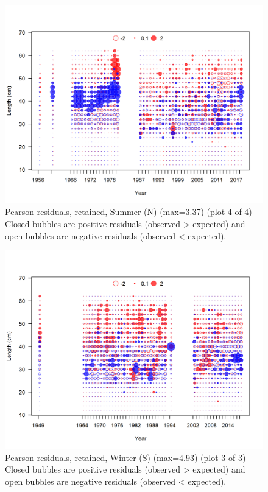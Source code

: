 \documentclass[12pt,]{article}
\begin{document}
\begin{figure}
\centering
\includegraphics{r4ss/plots_mod1/comp_lenfit_residsflt2mkt2_page4.png}
\caption{Pearson residuals, retained, Summer (N) (max=3.37) (plot 4 of
4)\\
Closed bubbles are positive residuals (observed \textgreater{} expected)
and open bubbles are negative residuals (observed \textless{} expected).
\label{fig:sn_len_pearson}}
\end{figure}

\begin{figure}
\centering
\includegraphics{r4ss/plots_mod1/comp_lenfit_residsflt3mkt2_page3.png}
\caption{Pearson residuals, retained, Winter (S) (max=4.93) (plot 3 of
3)\\
Closed bubbles are positive residuals (observed \textgreater{} expected)
and open bubbles are negative residuals (observed \textless{} expected).
\label{fig:ws_len_pearson}}
\end{figure}
\end{document}
